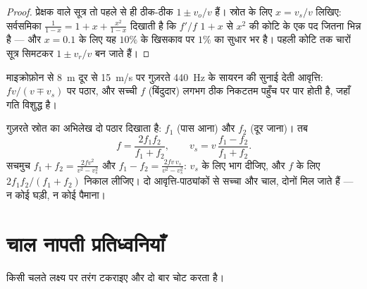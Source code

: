 \begin{proof}
प्रेक्षक वाले सूत्र तो पहले से ही ठीक-ठीक $1 \pm v_o/v$ हैं। स्रोत के लिए $x = v_s/v$
लिखिए: सर्वसमिका $\frac{1}{1 - x} = 1 + x + \frac{x^2}{1 - x}$ दिखाती है कि $f'/f$ $1 + x$ से $x^2$ की कोटि के एक पद
जितना भिन्न है --- और $x = 0.1$ के लिए यह $10\%$ के खिसकाव पर $1\%$ का सुधार भर
है। पहली कोटि तक चारों सूत्र सिमटकर $1 \pm v_r/v$ बन जाते हैं।
\end{proof}

\begin{omfigure}

{\small माइक्रोफ़ोन से \qty{8}{m} दूर से \qty{15}{m/s} पर गुज़रते \qty{440}{Hz} के सायरन की
सुनाई देती आवृत्ति: $fv/(v \mp v_s)$ पर पठार, और सच्ची $f$ (बिंदुदार) लगभग
ठीक निकटतम पहुँच पर पार होती है, जहाँ गति विशुद्ध  है।}
\end{omfigure}

\begin{method}[गुज़रना पढ़ना]\label{met:g12:doppler-effect:pass}
गुज़रते स्रोत का अभिलेख दो पठार दिखाता है: $f_1$ (पास आना) और $f_2$ (दूर
जाना)। तब
\[
f = \frac{2 f_1 f_2}{f_1 + f_2}, \qquad
v_s = v\,\frac{f_1 - f_2}{f_1 + f_2}.
\]
सचमुच $f_1 + f_2 = \frac{2fv^2}{v^2 - v_s^2}$ और $f_1 - f_2 = \frac{2fv\,v_s}{v^2 - v_s^2}$: $v_s$ के लिए भाग दीजिए, और $f$ के लिए $2f_1 f_2/(f_1 + f_2)$
निकाल लीजिए। दो आवृत्ति-पाठ्यांकों से सच्चा  और चाल,
दोनों मिल जाते हैं --- न कोई घड़ी, न कोई पैमाना।
\end{method}

\section{चाल नापती प्रतिध्वनियाँ}

किसी चलते लक्ष्य पर तरंग टकराइए और  दो बार चोट
करता है।

